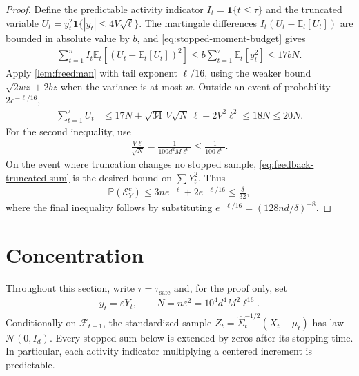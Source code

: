 \documentclass[11pt]{article}
\newcommand{\E}{\mathbb E}
\newcommand{\Pp}{\mathbb P}
\newcommand{\F}{\mathcal F}
\newcommand{\N}{\mathcal N}
\newcommand{\1}{\mathbf 1}
\newcommand{\eps}{\varepsilon}
\begin{document}
\begin{proof}
    Define the predictable activity indicator $I_t=\1\{t\leq\tau\}$ and
    the truncated variable
    $U_t=y_t^2\1\{|y_t|\leq4V\sqrt\ell\}$.
    The martingale differences $I_t(U_t-\E_t[U_t])$ are bounded in
    absolute value by $b$, and \eqref{eq:stopped-moment-budget} gives
    \begin{align}
        \sum_{t=1}^n I_t\E_t[(U_t-\E_t[U_t])^2]
        \leq b\sum_{t=1}^\tau\E_t[y_t^2]
        \leq17bN.
    \end{align}
    Apply \cref{lem:freedman} with tail exponent $\ell/16$, using the
    weaker bound $\sqrt{2wz}+2bz$ when the variance is at most $w$.
    Outside an event of probability $2e^{-\ell/16}$,
    \begin{align}
        \sum_{t=1}^\tau U_t
         & \leq17N+\sqrt{34}\,V\sqrt N\,\ell+2V^2\ell^2
        \leq18N\leq20N.
        \label{eq:feedback-truncated-sum}
    \end{align}
    For the second inequality, use
    \begin{align}
        \frac{V\ell}{\sqrt N}
        =\frac{1}{100d^2M\ell^6}
        \leq\frac{1}{100\ell^6}.
        \label{eq:feedback-cap-to-budget}
    \end{align}
    On the event where truncation changes no stopped sample,
    \eqref{eq:feedback-truncated-sum} is the desired bound on
    $\sum Y_t^2$. Thus
    \begin{align}
        \Pp(\mathcal E_Y^c)
        \leq3ne^{-\ell}+2e^{-\ell/16}
        \leq\frac{\delta}{32},
    \end{align}
    where the final inequality follows by substituting
    $e^{-\ell/16}=(128nd/\delta)^{-8}$.
\end{proof}

\section{Concentration}
\label{app:concentration}
Throughout this section, write $\tau=\tau_{\mathrm{safe}}$ and, for the
proof only, set
\begin{align}
    y_t=\eps Y_t,
    \qquad N=n\eps^2=10^4d^4M^2\ell^{16}.
    \label{eq:normalised-feedback}
\end{align}
Conditionally on $\F_{t-1}$, the standardized sample
$Z_t=\widehat\Sigma_t^{-1/2}(X_t-\mu_t)$ has law $\N(0,I_d)$.
Every stopped sum below is extended by zeros after its stopping time.
In particular, each activity indicator multiplying a centered increment
is predictable.
\end{document}
